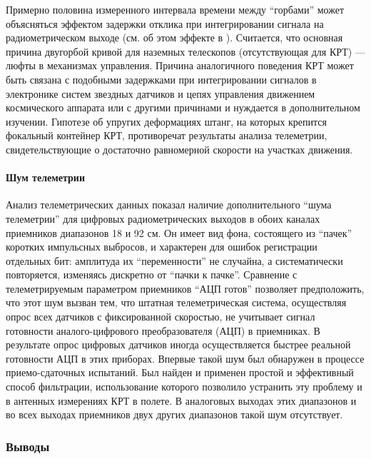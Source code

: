 Примерно половина измеренного интервала времени между ``горбами'' может объясняться эффектом
задержки отклика при интегрировании сигнала на радиометрическом выходе (см. об этом эффекте в
\cite{Kuzmin_1964}). Считается, что основная причина двугорбой кривой для наземных телескопов
(отсутствующая для КРТ) --- люфты в механизмах управления. Причина аналогичного поведения КРТ может
быть связана с подобными задержками при интегрировании сигналов в электронике систем звездных
датчиков и цепях управления движением космического аппарата или с другими причинами и нуждается в
дополнительном изучении. Гипотезе об упругих деформациях штанг, на которых крепится фокальный
контейнер КРТ, противоречат результаты анализа телеметрии, свидетельствующие о достаточно
равномерной скорости на участках движения.

\paragraph{Шум телеметрии}

Анализ телеметрических данных показал наличие дополнительного
``шума телеметрии'' для цифровых радиометрических выходов в обоих каналах
приемников диапазонов 18 и 92 см.
Он имеет вид фона, состоящего из ``пачек'' коротких импульсных
выбросов, и характерен для ошибок регистрации отдельных бит: амплитуда их
``переменности'' не случайна, а систематически повторяется, изменяясь дискретно
от ``пачки к пачке''. Сравнение с телеметрируемым параметром приемников ``АЦП готов''
позволяет предположить, что этот шум вызван тем, что штатная телеметрическая система,
осуществляя опрос всех датчиков с фиксированной скоростью, не учитывает сигнал
готовности аналого-цифрового преобразователя (АЦП) в приемниках.
В результате опрос цифровых датчиков иногда осуществляется быстрее
реальной готовности АЦП в этих приборах. Впервые такой шум был обнаружен в
процессе приемо-сдаточных испытаний. Был найден и применен простой и эффективный
способ фильтрации, использование которого позволило устранить эту проблему
и в антенных измерениях КРТ в полете. В аналоговых выходах этих диапазонов
и во всех выходах приемников двух других диапазонов такой шум отсутствует.


\subsubsection{Выводы}

